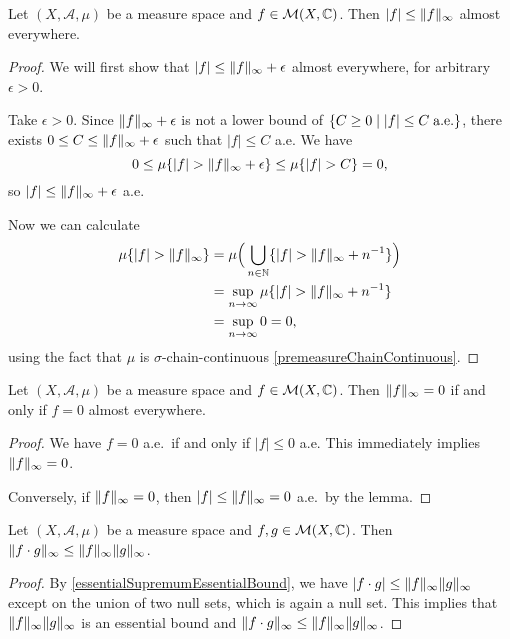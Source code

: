 \begin{lemma} \label{essentialSupremumEssentialBound}
Let $(X, \mathcal{A}, \mu)$ be a measure space and $f\in \operatorname{\mathcal{M}}(X, \mathbb{C})$. Then $|f| \leq \lVert f\rVert_\infty$ almost everywhere.
\end{lemma}
\begin{proof}
We will first show that $|f| \leq \lVert f\rVert_\infty + \epsilon$ almost everywhere, for arbitrary $\epsilon > 0$.

Take $\epsilon > 0$. Since $\lVert f\rVert_\infty + \epsilon$ is not a lower bound of $\setbuilder{C \geq 0}{|f| \leq C \; \text{a.e.}}$, there exists $0\leq C \leq \lVert f\rVert_\infty + \epsilon$ such that $|f| \leq C$ a.e.
We have
\[ 0 \leq \mu\{|f| >  \lVert f\rVert_\infty + \epsilon \} \leq \mu\{|f| >  C \} = 0, \]
so $|f| \leq \lVert f\rVert_\infty + \epsilon$ a.e. 

Now we can calculate
\begin{align*}
\mu \{ |f| > \lVert f\rVert_\infty \} &= \mu\Big( \bigcup_{n\in \mathbb{N}}\{ |f| > \lVert f\rVert_\infty + n^{-1} \} \Big) \\
&= \sup_{n\to \infty}\mu\{ |f| > \lVert f\rVert_\infty + n^{-1} \} \\
&= \sup_{n\to \infty}0 = 0,
\end{align*}
using the fact that $\mu$ is $\sigma$-chain-continuous \ref{premeasureChainContinuous}.
\end{proof}
\begin{corollary} \label{kernelEssentialSupremum}
Let $(X, \mathcal{A}, \mu)$ be a measure space and $f\in \operatorname{\mathcal{M}}(X, \mathbb{C})$. Then $\lVert f\rVert_\infty = 0$ \textup{if and only if} $f = 0$ almost everywhere.
\end{corollary}
\begin{proof}
We have $f = 0$ a.e.\ if and only if $|f| \leq 0$ a.e. This immediately implies $\lVert f\rVert_\infty = 0$.

Conversely, if $\lVert f\rVert_\infty = 0$, then $|f| \leq \lVert f\rVert_\infty = 0$ a.e.\ by the lemma.
\end{proof}

\begin{lemma} \label{LinftyNormSubmultiplicative}
Let $(X, \mathcal{A}, \mu)$ be a measure space and $f,g\in \operatorname{\mathcal{M}}(X, \mathbb{C})$. Then $\lVert f\cdot g\rVert_\infty \leq \lVert f\rVert_\infty\lVert g\rVert_\infty$.
\end{lemma}
\begin{proof}
By \ref{essentialSupremumEssentialBound}, we have $|f\cdot g| \leq \lVert f\rVert_\infty\lVert g\rVert_\infty$ except on the union of two null sets, which is again a null set. This implies that $\lVert f\rVert_\infty\lVert g\rVert_\infty$ is an essential bound and $\lVert f\cdot g\rVert_\infty \leq \lVert f\rVert_\infty\lVert g\rVert_\infty$.
\end{proof}

